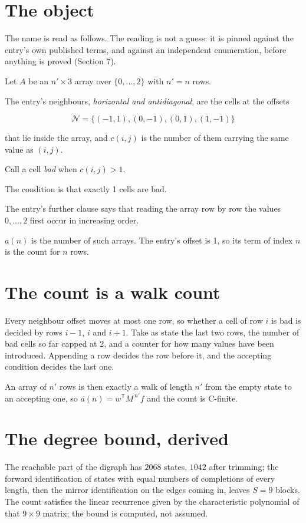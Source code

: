 \documentclass[11pt]{article}
\theoremstyle{definition}
\begin{document}
\section{The object}

The name is read as follows. The reading is not a guess: it is pinned against the entry's own published terms, and against an independent enumeration, before anything is proved (Section 7).

Let $A$ be an $n' \times 3$ array over $\{0,\dots,2\}$ with $n' = n$ rows.

The entry's neighbours, {\itshape horizontal and antidiagonal}, are the cells at the offsets

\[\mathcal{N} = \{(-1,1), (0,-1), (0,1), (1,-1)\}\]

that lie inside the array, and $c(i,j)$ is the number of them carrying the same value as $(i,j)$.

Call a cell {\itshape bad} when $c(i,j) > 1$.

The condition is that exactly 1 cells are bad.

The entry's further clause says that reading the array row by row the values $0,\dots,2$ first occur in increasing order.

$a(n)$ is the number of such arrays. The entry's offset is 1, so its term of index $n$ is the count for $n$ rows.

\section{The count is a walk count}

Every neighbour offset moves at most one row, so whether a cell of row $i$ is bad is decided by rows $i-1$, $i$ and $i+1$. Take as state the last two rows, the number of bad cells so far capped at 2, and a counter for how many values have been introduced. Appending a row decides the row before it, and the accepting condition decides the last one.

An array of $n'$ rows is then exactly a walk of length $n'$ from the empty state to an accepting one, so $a(n) = w^{\mathsf T}M^{\,n'}f$ and the count is C-finite.

\section{The degree bound, derived}

The reachable part of the digraph has $2068$ states, $1042$ after trimming; the forward identification of states with equal numbers of completions of every length, then the mirror identification on the edges coming in, leaves $S = 9$ blocks. The count satisfies the linear recurrence given by the characteristic polynomial of that $9\times9$ matrix; the bound is computed, not assumed.
\end{document}
